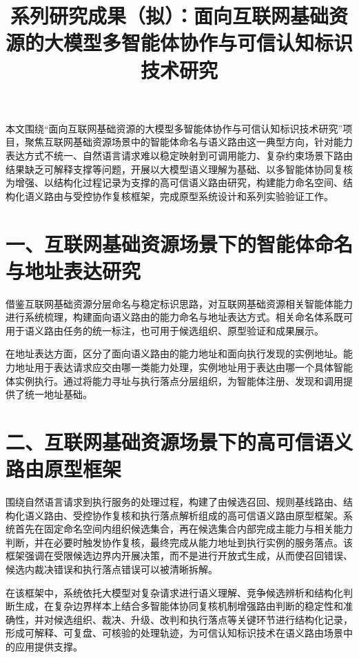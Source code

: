 \documentclass[11pt,a4paper]{ctexart}
\title{\textbf{系列研究成果（拟）：面向互联网基础资源的大模型多智能体协作与可信认知标识技术研究}}
\author{}
\date{}
\begin{document}
\maketitle
\vspace{-1.2em}

\noindent 本文围绕“面向互联网基础资源的大模型多智能体协作与可信认知标识技术研究”项目，聚焦互联网基础资源场景中的智能体命名与语义路由这一典型方向，针对能力表达方式不统一、自然语言请求难以稳定映射到可调用能力、复杂约束场景下路由结果缺乏可解释支撑等问题，开展以大模型语义理解为基础、以多智能体协同复核为增强、以结构化过程记录为支撑的高可信语义路由研究，构建能力命名空间、结构化语义路由与受控协作复核框架，完成原型系统设计和系列实验验证工作。

\section*{一、互联网基础资源场景下的智能体命名与地址表达研究}

借鉴互联网基础资源分层命名与稳定标识思路，对互联网基础资源相关智能体能力进行系统梳理，构建面向语义路由的能力命名与地址表达方式。相关命名体系既可用于语义路由任务的统一标注，也可用于候选组织、原型验证和成果展示。

在地址表达方面，区分了面向语义路由的能力地址和面向执行发现的实例地址。能力地址用于表达请求应交由哪一类能力处理，实例地址用于表达由哪一个具体智能体实例执行。通过将能力寻址与执行落点分层组织，为智能体注册、发现和调用提供了统一地址基础。

\section*{二、互联网基础资源场景下的高可信语义路由原型框架}

围绕自然语言请求到执行服务的处理过程，构建了由候选召回、规则基线路由、结构化语义路由、受控协作复核和执行落点解析组成的高可信语义路由原型框架。系统首先在固定命名空间内组织候选集合，再在候选集合内部完成主能力与相关能力判断，并在必要时触发协作复核，最终完成从能力地址到执行实例的服务落点。该框架强调在受限候选边界内开展决策，而不是进行开放式生成，从而使召回错误、候选内裁决错误和执行落点错误可以被清晰拆解。

在该框架中，系统依托大模型对复杂请求进行语义理解、竞争候选辨析和结构化判断生成，在复杂边界样本上结合多智能体协同复核机制增强路由判断的稳定性和准确性，并对候选组织、裁决、升级、改判和执行落点等关键环节进行结构化记录，形成可解释、可复盘、可核验的处理轨迹，为可信认知标识技术在语义路由场景中的应用提供支撑。
\end{document}
